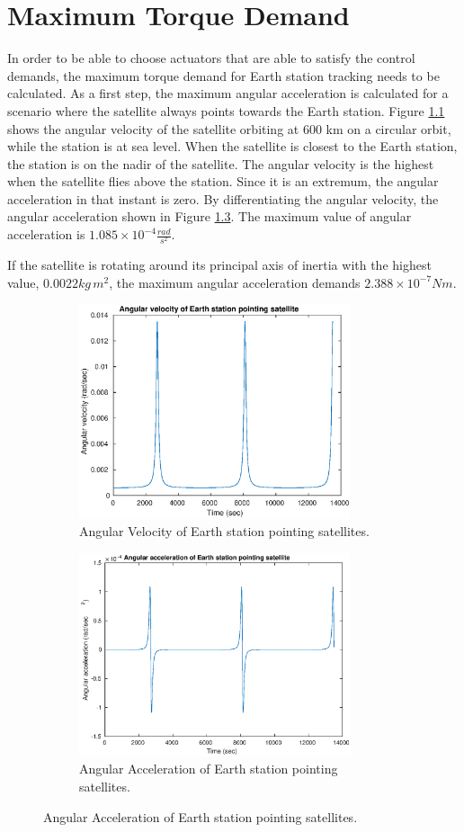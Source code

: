 \chapter{Maximum Torque Demand} \label{chap:D}

In order to be able to choose actuators that are able to satisfy the control demands, the maximum torque demand for Earth station tracking needs to be calculated. As a first step, the maximum angular acceleration is calculated for a scenario where the satellite always points towards the Earth station. Figure \ref{fig:maxOmega} shows the angular velocity of the satellite orbiting at 600 km on a circular orbit, while the station is at sea level. When the satellite is closest to the Earth station, the station is on the nadir of the satellite. The angular velocity is the highest when the satellite flies above the station. Since it is an extremum, the angular acceleration in that instant is zero. By differentiating the angular velocity, the angular acceleration shown in Figure \ref{fig:maxOmegaDot}. The maximum value of angular acceleration is $1.085 \times 10^{-4} \frac{rad}{s^2}$. 

If the satellite is rotating around its principal axis of inertia with the highest value, $0.0022 k\!g \, m^2$, the maximum angular acceleration demands  \boldmath$ 2.388 \times 10^{-7} Nm$.


\begin{figure}[H]
	\begin{subfigure}{0.5\linewidth}
			\centering
		\includegraphics[width=80mm]{figures/maxOmega}
		\caption{Angular Velocity of Earth station pointing satellites.}
		\label{fig:maxOmega}
	\end{subfigure}
	\begin{subfigure}{0.5\linewidth}
	\centering
\includegraphics[width=80mm]{figures/maxOmegaDot}
\caption{Angular Acceleration of Earth station pointing satellites.}
\label{fig:maxOmegaDot}
\end{subfigure}
\end{figure} 
